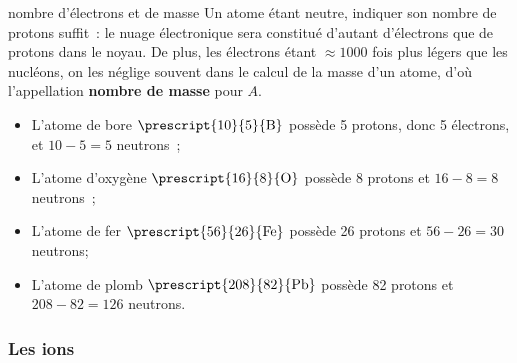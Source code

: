 \documentclass[../main/main.tex]{subfiles}
\begin{document}
\begin{tcbraster}[raster columns=2, raster equal height=rows]
    \begin{rema}[label=rema:atomeneutre]{nombre d'électrons et de masse}
        Un atome étant neutre, indiquer son nombre de protons suffit~: le nuage
        électronique sera constitué d'autant d'électrons que de protons dans le
        noyau. De plus, les électrons étant $\approx 1000$ fois plus légers que les
        nucléons, on les néglige souvent dans le calcul de la masse d'un atome, d'où
        l'appellation \textbf{nombre de masse} pour $A$.
    \end{rema}
    \begin{exem}[label=exem:atomes]{}
        \begin{itemize}
            \item L'atome de bore $ \prescript{10}{5}{\mathrm{B}}$ possède 5
                protons, donc 5 électrons, et $10-5=5$ neutrons~;
            \item L'atome d'oxygène $\prescript{16}{8}{\mathrm{O}}$ possède 8
                protons et $16-8=8$ neutrons~;
            \item L'atome de fer $ \prescript{56}{26}{\mathrm{Fe}}$ possède 26
                protons et $56-26 = 30$ neutrons;
            \item L'atome de plomb $\prescript{208}{82}{\mathrm{Pb}}$ possède 82
                protons et $208 - 82 = 126$ neutrons.
        \end{itemize}
    \end{exem}
\end{tcbraster}

\subsubsection{Les ions}
\end{document}
